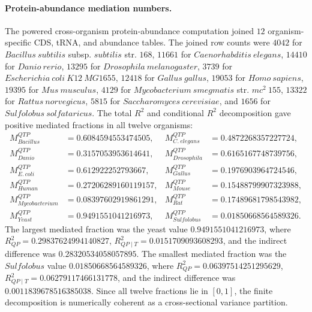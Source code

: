 \paragraph{Protein-abundance mediation numbers.}
The powered cross-organism protein-abundance computation joined $12$ organism-specific CDS, tRNA, and abundance tables.  The joined row counts were $4042$ for $Bacillus\ subtilis$ subsp. $subtilis$ str. $168$, $11661$ for $Caenorhabditis\ elegans$, $14410$ for $Danio\ rerio$, $13295$ for $Drosophila\ melanogaster$, $3739$ for $Escherichia\ coli\ K12\ MG1655$, $12418$ for $Gallus\ gallus$, $19053$ for $Homo\ sapiens$, $19395$ for $Mus\ musculus$, $4129$ for $Mycobacterium\ smegmatis$ str. $mc^2\ 155$, $13322$ for $Rattus\ norvegicus$, $5815$ for $Saccharomyces\ cerevisiae$, and $1656$ for $Sulfolobus\ solfataricus$.  The total $R^2$ and conditional $R^2$ decomposition gave positive mediated fractions in all twelve organisms:
$$
\begin{aligned}
M^{QTP}_{Bacillus} &= 0.6084594553474505, & M^{QTP}_{C.\ elegans} &= 0.4872268357227724,\\
M^{QTP}_{Danio} &= 0.3157053953614641, & M^{QTP}_{Drosophila} &= 0.6165167748739756,\\
M^{QTP}_{E.\ coli} &= 0.612922252793667, & M^{QTP}_{Gallus} &= 0.1976903964724546,\\
M^{QTP}_{Human} &= 0.27206289160119157, & M^{QTP}_{Mouse} &= 0.15488799907323988,\\
M^{QTP}_{Mycobacterium} &= 0.08397602919861291, & M^{QTP}_{Rat} &= 0.17489681798543982,\\
M^{QTP}_{Yeast} &= 0.9491551041216973, & M^{QTP}_{Sulfolobus} &= 0.01850668564589326.
\end{aligned}
$$
The largest mediated fraction was the yeast value $0.9491551041216973$, where $R^2_{QP}=0.29837624994140827$, $R^2_{QP\mid T}=0.0151709093608293$, and the indirect difference was $0.28320534058057895$.  The smallest mediated fraction was the $Sulfolobus$ value $0.01850668564589326$, where $R^2_{QP}=0.06397514251295629$, $R^2_{QP\mid T}=0.06279117466131778$, and the indirect difference was $0.0011839678516385038$.  Since all twelve fractions lie in $[0,1]$, the finite decomposition is numerically coherent as a cross-sectional variance partition.

